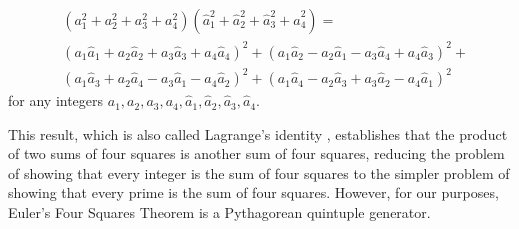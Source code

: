 \documentclass[11pt]{article}
\begin{document}
\begin{theorem}
\label{thm:euler}
\[
\begin{array}{ll}
& (a_1^2 + a_2^2 + a_3^2 + a_4^2) 
(\hat{a}^2_1 + \hat{a}^2_2 + \hat{a}^2_3 + \hat{a}^2_4) = \\
& (a_1 \hat{a}_1 + a_2\hat{a}_2 + a_3\hat{a}_3 + a_4\hat{a}_4)^2 +
  (a_1 \hat{a}_2 - a_2\hat{a}_1 - a_3\hat{a}_4 + a_4\hat{a}_3)^2 + \\
& (a_1\hat{a}_3 + a_2\hat{a}_4 - a_3\hat{a}_1 - a_4\hat{a}_2)^2 +
  (a_1\hat{a}_4 - a_2\hat{a}_3 + a_3\hat{a}_2 - a_4\hat{a}_1)^2
\end{array}
\]
for any integers $a_1,a_2,a_3,a_4,\hat{a}_1,\hat{a}_2,\hat{a}_3,\hat{a}_4$.
\end{theorem}
%
%
This result, which is also called Lagrange's identity \cite{herstein75}, %
establishes that the product of two sums of four squares is another sum of four squares,
reducing the problem of showing that every integer is the sum of four squares to 
the simpler problem of showing that every prime is the sum of four squares.
However, for our purposes, 
Euler's Four Squares Theorem is a Pythagorean quintuple generator.
\end{document}
